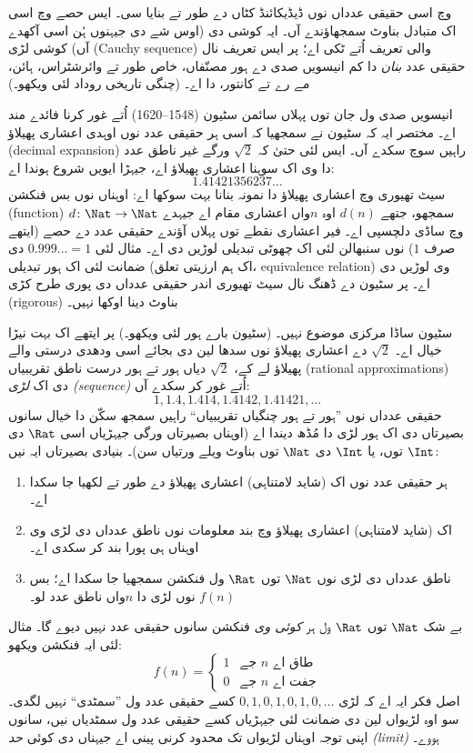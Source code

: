 \documentclass[../../../include/open-logic-section]{subfiles}
\begin{document}


 وچ اسی حقیقی عدداں نوں ڈیڈیکائنڈ کٹاں دے طور تے
بنایا سی۔ ایس حصے وچ اسی اک متبادل بناوٹ سمجھاؤندے آں۔ ایہ کوشی دی
(اوس شے دی جیہنوں ہُن اسی آکھدے آں) کوشی لڑی (Cauchy sequence) والی تعریف اُتے ٹکی اے؛
پر ایس تعریف نال حقیقی عدد \emph{بنان} دا کم انیسویں صدی دے ہور مصنّفاں،
خاص طور تے وائرشٹراس، ہائن، مے رے تے کانتور، دا اے۔ (چنگی تاریخی روداد
لئی \citeauthor{OConnorRobertson:RN} \citeyear{OConnorRobertson:RN} ویکھو۔)

انیسویں صدی ول جان توں پہلاں سائمن سٹیون (1548--1620) اُتے غور کرنا
فائدے مند اے۔ مختصر ایہ کہ سٹیون نے سمجھیا کہ اسی ہر حقیقی عدد نوں
اوہدی اعشاری پھیلاؤ (decimal expansion) راہیں سوچ سکدے آں۔ ایس لئی حتیٰ کہ $\sqrt{2}$
ورگے غیر ناطق عدد دا وی اک سوہنا اعشاری پھیلاؤ اے، جیہڑا ایویں شروع
ہوندا اے:
\[
	1.41421356237\ldots
\]
سیٹ تھیوری وچ اعشاری پھیلاؤ دا نمونہ بنانا بہت سوکھا اے: اوہناں نوں
بس فنکشن (function) $d \colon \Nat \to \Nat$ سمجھو، جتھے $d(n)$ اوہ $n$واں
اعشاری مقام اے جیہدے وچ ساڈی دلچسپی اے۔ فیر اعشاری نقطے توں پہلاں
آؤندے حقیقی عدد دے حصے (ایتھے صرف $1$) نوں سنبھالن لئی اک چھوٹی تبدیلی
لوڑیں دی اے۔ مثال لئی $0.999\ldots = 1$ دی ضمانت لئی اک ہور تبدیلی
(اک ہم ارزیتی تعلق، equivalence relation) وی لوڑیں دی اے۔ پر سٹیون دے
ڈھنگ نال سیٹ تھیوری اندر حقیقی عدداں دی پوری طرح کڑی (rigorous) بناوٹ دینا اوکھا نہیں۔

سٹیون ساڈا مرکزی موضوع نہیں۔ (سٹیون بارے ہور لئی
\citealt{KatzKatz2012} ویکھو۔) پر ایتھے اک بہت نیڑا خیال اے۔
$\sqrt{2}$ دے اعشاری پھیلاؤ نوں سدھا لین دی بجائے اسی ودھدی درستی
والے پھیلاؤ لے کے، $\sqrt{2}$ دیاں ہور تے ہور درست ناطق تقریبیاں
(rational approximations) دی اک \emph{لڑی (sequence)} اُتے غور کر سکدے آں:
\[
1, 1.4, 1.414, 1.4142, 1.41421,\ldots
\]
حقیقی عدداں نوں ”ہور تے ہور چنگیاں تقریبیاں“ راہیں سمجھ سکّن دا خیال
سانوں بصیرتاں دی اک ہور لڑی دا مُڈھ دیندا اے (اوہناں بصیرتاں ورگی
جیہڑیاں اسی $\Rat$ دی $\Int$ توں، یا $\Int$ دی $\Nat$ توں بناوٹ
ویلے ورتیاں سن)۔ بنیادی بصیرتاں ایہ نیں:
\begin{enumerate}
	\item ہر حقیقی عدد نوں اک (شاید لامتناہی) اعشاری پھیلاؤ دے طور تے لکھیا جا سکدا اے۔
	\item اک (شاید لامتناہی) اعشاری پھیلاؤ وچ بند معلومات نوں ناطق عدداں دی لڑی وی اوہناں ہی پورا بند کر سکدی اے۔
	\item ناطق عدداں دی لڑی نوں $\Nat$ توں $\Rat$ ول فنکشن سمجھیا جا سکدا اے؛ بس $f(n)$ نوں لڑی دا $n$واں ناطق عدد لو۔
\end{enumerate}
بے شک $\Nat$ توں $\Rat$ ول ہر \emph{کوئی وی} فنکشن سانوں حقیقی
عدد نہیں دیوے گا۔ مثال لئی ایہ فنکشن ویکھو:
\[
	f(n) =\begin{cases}
			1 & \text{جے }n\text{ طاق اے}\\
			0 &\text{جے }n\text{ جفت اے}
		\end{cases}
\]
اصل فکر ایہ اے کہ لڑی $0,1,0,1,0,1,0,\ldots$ کسے حقیقی عدد ول
”سمٹدی“ نہیں لگدی۔ سو اوہ لڑیواں لین دی ضمانت لئی جیہڑیاں کسے حقیقی
عدد ول سمٹدیاں نیں، سانوں اپنی توجہ اوہناں لڑیواں تک محدود کرنی پینی
اے جیہناں دی کوئی \emph{حد (limit)} ہووے۔
\end{document}
